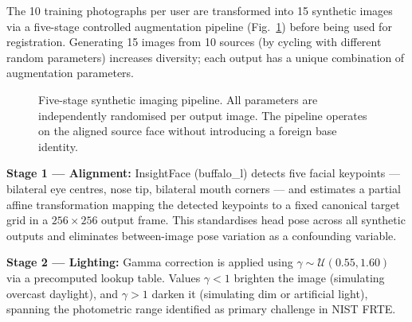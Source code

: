\documentclass[conference]{IEEEtran}
\begin{document}
The 10 training photographs per user are transformed into 15 synthetic images via a five-stage controlled augmentation pipeline (Fig.~\ref{fig:pipeline}) before being used for registration. Generating 15 images from 10 sources (by cycling with different random parameters) increases diversity; each output has a unique combination of augmentation parameters.

\begin{figure}[t]
\centering
{}
\caption{Five-stage synthetic imaging pipeline. All parameters are independently randomised per output image. The pipeline operates on the aligned source face without introducing a foreign base identity.}
\label{fig:pipeline}
\end{figure}

\textbf{Stage 1 — Alignment:} InsightFace (buffalo\_l) detects five facial keypoints — bilateral eye centres, nose tip, bilateral mouth corners — and estimates a partial affine transformation mapping the detected keypoints to a fixed canonical target grid in a $256\!\times\!256$ output frame. This standardises head pose across all synthetic outputs and eliminates between-image pose variation as a confounding variable.

\textbf{Stage 2 — Lighting:} Gamma correction is applied using $\gamma \sim \mathcal{U}(0.55, 1.60)$ via a precomputed lookup table. Values $\gamma < 1$ brighten the image (simulating overcast daylight), and $\gamma > 1$ darken it (simulating dim or artificial light), spanning the photometric range identified as primary challenge in NIST FRTE.
\end{document}
